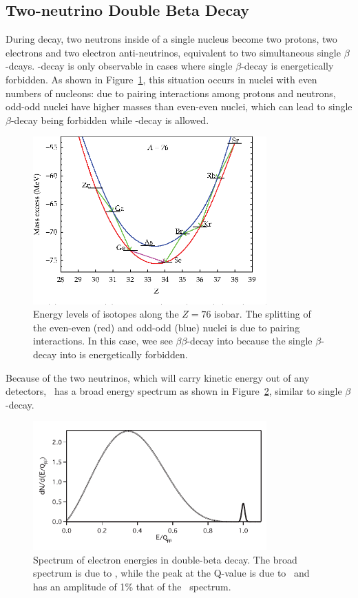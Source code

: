 \documentclass[/main.tex]{subfiles}
\begin{document}
\subsection{Two-neutrino Double Beta Decay}
During \tnbb decay, two neutrons inside of a single nucleus become two protons, two electrons and two electron anti-neutrinos, equivalent to two simultaneous single $\beta$-dcays.
\bb -decay is only observable in cases where single $\beta$-decay is energetically forbidden.
As shown in Figure~\ref{fig:bballowed}, this situation occurs in nuclei with even numbers of nucleons: due to pairing interactions among protons and neutrons, odd-odd nuclei have higher masses than even-even nuclei, which can lead to single $\beta$-decay being forbidden while \bb -decay is allowed.
\begin{figure}[t]
  \centering
  \includegraphics[width=0.8\textwidth]{bballowed}
  \caption[Allowed $\beta\beta$ Isobar]{\label{fig:bballowed}
    Energy levels of isotopes along the $Z=76$ isobar. The splitting of the even-even (red) and odd-odd (blue) nuclei is due to pairing interactions. In this case, wee see  $\beta\beta$-decay into  because the single $\beta$-decay into  is energetically forbidden.
  }
\end{figure}
Because of the two neutrinos, which will carry kinetic energy out of any detectors, \tnbb\ has a broad energy spectrum as shown in Figure~\ref{fig:bbspectrum}, similar to single $\beta$-decay.
\begin{figure}[t]
  \centering
  \includegraphics[width=0.8\textwidth]{bbSpectrum}
  \caption[Energy Spectrum of \tnbb\ and \znbb]{\label{fig:bbspectrum}
    Spectrum of electron energies in double-beta decay. The broad spectrum is due to \tnbb, while the peak at the Q-value is due to \znbb\ and has an amplitude of 1\% that of the \tnbb\ spectrum.
  }
\end{figure}
\end{document}
